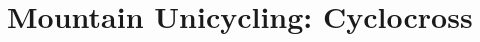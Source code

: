 \part{Mountain Unicycling: Cyclocross \label{part:muni-cyclocross}}
\parttoc
\thispagestyle{empty}




